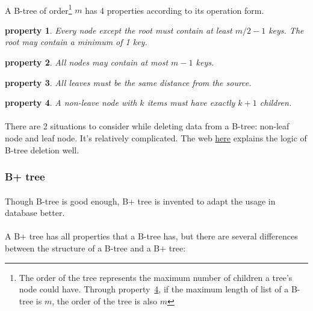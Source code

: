 \documentclass{article}
\newtheorem{property}{property}[section]
\begin{document}
\paragraph{}
A B-tree of order\footnote{The order of the tree represents the maximum number of children a tree's node could have. Through property~\ref{property_ktok+1}, if the maximum length of list of a B-tree is $m$, the order of the tree is also $m$}
$m$ has 4 properties according to its operation form.

\begin{property}
    Every node except the root must contain at least $m/2-1$ keys. The root may contain a minimum of 1 key.
\end{property}

\begin{property}
    All nodes may contain at most $m - 1$ keys.
\end{property}

\begin{property}\label{property_samedistance}
    All leaves must be the same distance from the source.
\end{property}

\begin{property}\label{property_ktok+1}
    A non-leave node with $k$ items must have exactly $k+1$ children.
\end{property}

\paragraph{}
There are 2 situations to consider while deleting data from a B-tree: non-leaf node and leaf node. It's relatively complicated. The web \href{https://www.programiz.com/dsa/deletion-from-a-b-tree}{here} explains the logic of B-tree deletion well.

\subsubsection{B+ tree}\label{b+}

\paragraph{}
Though B-tree is good enough, B+ tree is invented to adapt the usage in database better.

\paragraph{}
A B+ tree has all properties that a B-tree has, but there are several differences between the structure of a B-tree and a B+ tree:
\end{document}

